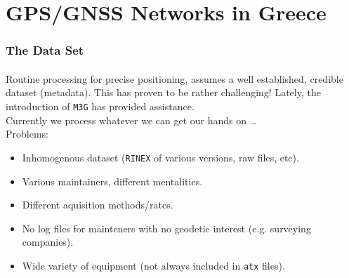 
\section{GPS/GNSS Networks in Greece}

\begin{frame}\frametitle{The Data Set}\framesubtitle{}
\vskip-1.5cm
  Routine processing for precise positioning, assumes a well established, 
  credible dataset (metadata). This has proven to be rather challenging! Lately, 
  the introduction of \texttt{M3G} has provided assistance.\\
  \bigskip
  Currently we process whatever we can get our hands on \ldots\\
  Problems:
  \begin{itemize}
    \item Inhomogenous dataset (\texttt{RINEX} of various versions, raw files, etc).
    \item Various maintainers, different mentalities.
    \item Different aquisition methods/rates.
    \item No log files for mainteners with no geodetic interest (e.g. surveying companies).
    \item Wide variety of equipment (not always included in \texttt{atx} files).
  \end{itemize}
\end{frame}
\note


